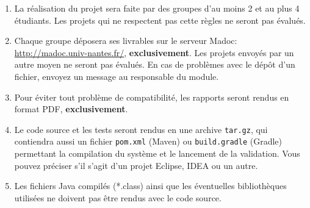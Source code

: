 \documentclass[a4]{report}
\begin{document}
\begin{enumerate}
	\item La réalisation du projet sera faite par des groupes d'au moins 2 et au plus 4 étudiants.
	Les projets qui ne respectent pas cette règles ne seront pas évalués.

	\item Chaque groupe déposera ses livrables sur le serveur Madoc: \url{http://madoc.univ-nantes.fr/}, \textbf{exclusivement}.
	Les projets envoyés par un autre moyen ne seront pas évalués.
	En cas de problèmes avec le dépôt d'un fichier, envoyez un message au responsable du module.
	
	\item Pour éviter tout problème de compatibilité, les rapports seront rendus en format PDF, \textbf{exclusivement}.
	
	\item Le code source et les tests seront rendus en une archive \texttt{tar.gz}, qui contiendra aussi un fichier \texttt{pom.xml} (Maven) ou \texttt{build.gradle} (Gradle) permettant la compilation du système et le lancement de la validation. Vous pouvez préciser s'il s'agit d'un projet Eclipse, IDEA ou un autre.
	
	\item Les fichiers Java compilés (*.class) ainsi que les éventuelles bibliothèques utilisées ne doivent pas être rendus avec le code source.
\end{enumerate}












 
\end{document}
